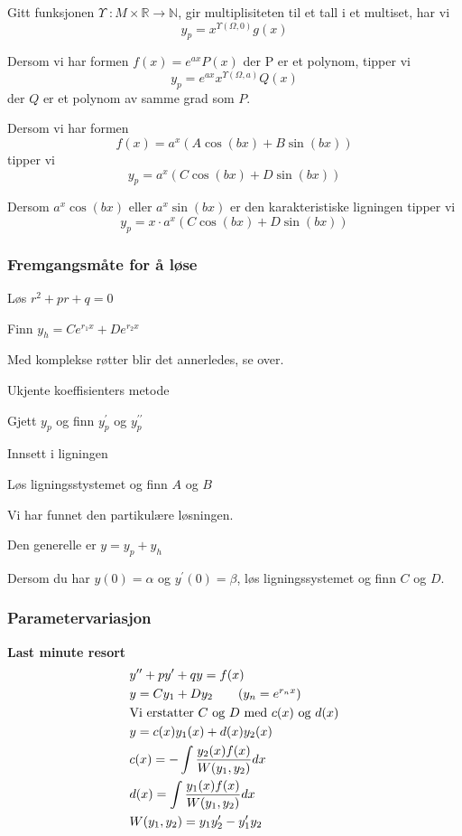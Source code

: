 \documentclass[defaultpackages]{cheatsheet}
\begin{document}
Gitt funksjonen $\Upsilon\; \colon M \times \mathbb{R} \to \mathbb{N}$, gir multiplisiteten til et tall i et multiset, har vi
\[y_p = x^{\Upsilon(\Omega, 0)}g(x)\]

Dersom vi har formen $f(x) = e^{ax}P(x)$ der P er et polynom, tipper vi
\[y_p = e^{ax}x^{\Upsilon(\Omega, a)}Q(x)\]
der $Q$ er et polynom av samme grad som $P$.

Dersom vi har formen $$f(x) = a^x(A\cos (bx) + B\sin (bx))$$ tipper vi
\[y_p = a^x(C\cos(bx) + D\sin(bx))\]

Dersom $a^x\cos(bx)$ eller $a^x\sin(bx)$ er den karakteristiske ligningen tipper vi
\[y_p = x\cdot a^x(C\cos (bx) + D\sin (bx))\]


\subsubsection{Fremgangsmåte for å løse}
\begin{compactitem}
	\item Løs $r^2 + pr + q = 0$
	\item Finn $y_h = Ce^{r_1x}+De^{r_2x}$
	\item Med komplekse røtter blir det annerledes, se over.
	\item Ukjente koeffisienters metode
	\item Gjett $y_p$ og finn $y_p^\prime$ og $y_p^{\prime\prime}$
	\item Innsett i ligningen
	\item Løs ligningsstystemet og finn $A$ og $B$
	\item Vi har funnet den partikulære løsningen.
	\item Den generelle er $y=y_p+y_h$
	\item Dersom du har $y(0)=\alpha$ og $y^\prime (0) = \beta$, løs ligningssystemet og finn $C$ og $D$.
\end{compactitem}
\subsubsection{Parametervariasjon}
\textbf{Last minute resort}
\begin{align*}
	&y^{\prime\prime} + py^\prime + qy = f(x)\\
	& y = Cy_1 + Dy_2  \tag{$y_n = e^{r_nx}$}\\
	& \text{Vi erstatter $C$ og $D$ med $c(x)$ og $d(x)$}\\
	& y = c(x)y_1(x)+d(x)y_2(x)\\
	& c(x) = - \int \frac{y_2(x)f(x)}{W(y_1,y_2)} dx\\
	& d(x) = \int \frac{y_1(x)f(x)}{W(y_1,y_2)} dx\\
	& W(y_1, y_2) = y_1y_2^\prime - y_1^\prime y_2
\end{align*}
\end{document}
